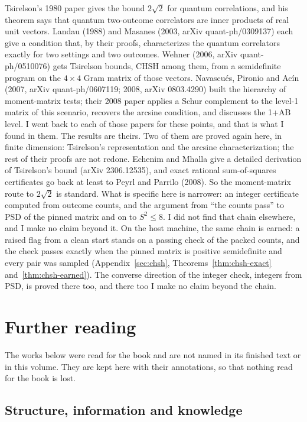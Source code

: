 \documentclass[11pt,twoside]{article}
\theoremstyle{thielethm}
\theoremstyle{thieledef}
\theoremstyle{thieledef}
\theoremstyle{thieledef}
\theoremstyle{thielethm}
\theoremstyle{thieleobs}
\theoremstyle{thielethm}
\begin{document}
Tsirelson's 1980 paper gives the bound $2\sqrt 2$ for quantum correlations, and his theorem
says that quantum two-outcome correlators are inner products of real unit vectors. Landau (1988)
and Masanes (2003, arXiv quant-ph/0309137) each give a condition that, by their proofs,
characterizes the quantum correlators exactly for two settings and two outcomes. Wehner (2006,
arXiv quant-ph/0510076) gets Tsirelson bounds, CHSH among them, from a semidefinite program on
the $4 \times 4$ Gram matrix of those vectors. Navascués,
Pironio and Acín (2007, arXiv quant-ph/0607119; 2008, arXiv 0803.4290) built the hierarchy of
moment-matrix tests; their 2008 paper applies a Schur complement to the level-1 matrix of this
scenario, recovers the arcsine condition, and discusses the 1+AB level. I went back to each of
those papers for these points, and that is what I found in them. The results are theirs. Two of
them are proved again here, in finite dimension: Tsirelson's representation
and the arcsine characterization; the rest of
their proofs are not redone. Echenim and Mhalla give a detailed derivation of Tsirelson's
bound (arXiv 2306.12535), and exact rational
sum-of-squares certificates go back at least to Peyrl and Parrilo (2008). So the
moment-matrix route to $2\sqrt 2$ is standard. What is specific here is narrower: an integer
certificate computed from outcome counts, and the argument from ``the counts pass'' to PSD
of the pinned matrix and on to $S^2 \le 8$. I did not find that chain elsewhere, and I make no
claim beyond it.
On the host machine, the same chain is earned: a raised flag from a clean start
stands on a passing check of the packed counts, and the check passes exactly when the pinned matrix
is positive semidefinite and every pair was sampled (Appendix~\ref{sec:chsh},
Theorems~\ref{thm:chsh-exact} and~\ref{thm:chsh-earned}). The converse direction of the integer check,
integers from PSD, is proved there too, and there too I make no claim beyond the chain.



\section{Further reading}

The works below were read for the book and are not named in its finished text or in this volume. They are kept here with their annotations, so that nothing read for the book is lost.

\subsection{Structure, information and knowledge}
\end{document}
